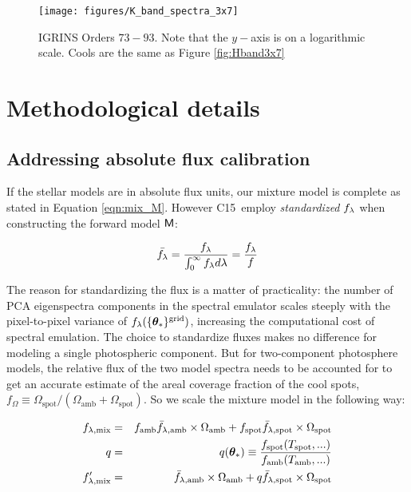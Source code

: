 \documentclass[twocolumn]{emulateapj}%
\newcommand{\iancze}{{\sc C15}}
\begin{document}
\begin{figure*}
 \centering
 \texttt{[image: figures/K\_band\_spectra\_3x7]}
 \caption{IGRINS Orders $73-93$.  Note that the $y-$axis is on a logarithmic scale.  Cools are the same as Figure \ref{fig:Hband3x7}}
 \label{fig:Kband3x7}
\end{figure*}


\section{Methodological details}
\label{methods-details}

\subsection{Addressing absolute flux calibration}
If the stellar models are in absolute flux units, our mixture model is complete as stated in Equation \ref{eqn:mix_M}.  However \iancze\ employ \emph{standardized} $f_\lambda$ when constructing the forward model $\mathsf{M}$:


\begin{eqnarray} \label{eqn:normalization}
\bar {f_\lambda} = \frac{f_\lambda}{\int_{0}^{\infty} f_\lambda d\lambda} = \frac{f_\lambda}{f}
\end{eqnarray}

The reason for standardizing the flux is a matter of practicality: the number of PCA eigenspectra components in the spectral emulator scales steeply with the pixel-to-pixel variance of $f_{\lambda}(\{{\bm \theta}_{\ast}\}^\textrm{grid})$, increasing the computational cost of spectral emulation.  The choice to standardize fluxes makes no difference for modeling a single photospheric component.  But for two-component photosphere models, the relative flux of the two model spectra needs to be accounted for to get an accurate estimate of the areal coverage fraction of the cool spots, $f_{\Omega} \equiv \Omega_{\mathrm{spot}}/(\Omega_{\mathrm{amb}}+\Omega_{\mathrm{spot}})$.  So we scale the mixture model in the following way:

\begin{eqnarray} \label{eqn:norm_scaling}
f_{\lambda, \mathrm{mix}} &=& f_{\mathrm{amb}} \bar f_{\lambda, \mathrm{amb}} \times \Omega_{\mathrm{amb}} + f_{\mathrm{spot}} \bar f_{\lambda, \mathrm{spot}} \times \Omega_{\mathrm{spot}} \\
q &=& q({\bm \theta}_{\ast})\equiv \frac{f_{\mathrm{spot}}(T_\textrm{spot}, ...)}{f_{\mathrm{amb}}(T_\textrm{amb}, ...)} \\
f_{\lambda, \mathrm{mix}}^{\prime} &=& \bar f_{\lambda, \mathrm{amb}} \times \Omega_{\mathrm{amb}} + q \bar f_{\lambda, \mathrm{spot}} \times \Omega_{\mathrm{spot}}
\end{eqnarray}
\end{document}
